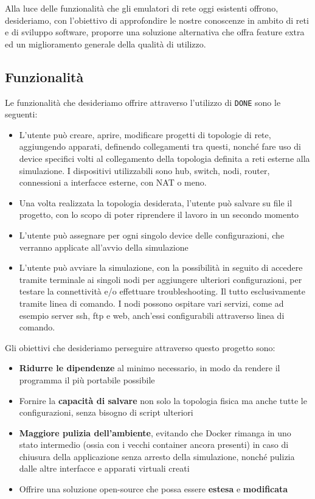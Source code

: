 Alla luce delle funzionalità che gli emulatori di rete oggi esistenti offrono, desideriamo, con l'obiettivo di approfondire le nostre conoscenze in ambito di reti e di sviluppo software, proporre una soluzione alternativa che offra feature extra ed un miglioramento generale della qualità di utilizzo.
\subsection{Funzionalità}
Le funzionalità che desideriamo offrire attraverso l'utilizzo di \texttt{DONE} sono le seguenti: 
\begin{itemize}
    \item L'utente può creare, aprire, modificare progetti di topologie di rete, aggiungendo apparati, definendo collegamenti tra questi, nonché fare uso di device specifici volti al collegamento della topologia definita a reti esterne alla simulazione. I dispositivi utilizzabili sono hub, switch, nodi, router, connessioni a interfacce esterne, con NAT o meno.
    \item Una volta realizzata la topologia desiderata, l'utente può salvare su file il progetto, con lo scopo di poter riprendere il lavoro in un secondo momento
    \item L'utente può assegnare per ogni singolo device delle configurazioni, che verranno applicate all'avvio della simulazione
    \item L'utente può avviare la simulazione, con la possibilità in seguito di accedere tramite terminale ai singoli nodi per aggiungere ulteriori configurazioni, per testare la connettività e/o effettuare troubleshooting. Il tutto esclusivamente tramite linea di comando. I nodi possono ospitare vari servizi, come ad esempio server ssh, ftp e web, anch'essi configurabili attraverso linea di comando. 
\end{itemize}
Gli obiettivi che desideriamo perseguire attraverso questo progetto sono:
\begin{itemize}
    \item \textbf{Ridurre le dipendenze} al minimo necessario, in modo da rendere il programma il più portabile possibile
    \item Fornire la \textbf{capacità di salvare} non solo la topologia fisica ma anche tutte le configurazioni, senza bisogno di script ulteriori
    \item \textbf{Maggiore pulizia dell'ambiente}, evitando che Docker rimanga in uno stato intermedio (ossia con i vecchi container ancora presenti) in caso di chiusura della applicazione senza arresto della simulazione, nonché pulizia dalle altre interfacce e apparati virtuali creati
    \item Offrire una soluzione open-source che possa essere \textbf{estesa} e \textbf{modificata}
\end{itemize}
